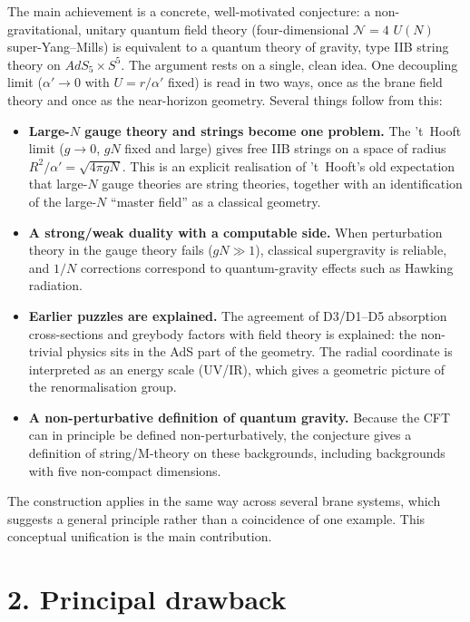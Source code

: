 \documentclass[11pt,a4paper]{article}
\begin{document}
The main achievement is a concrete, well-motivated conjecture: a non-gravitational, unitary quantum field theory (four-dimensional $\mathcal{N}=4$ $U(N)$ super-Yang--Mills) is equivalent to a quantum theory of gravity, type IIB string theory on $AdS_5\times S^5$. The argument rests on a single, clean idea. One decoupling limit ($\alpha'\to0$ with $U=r/\alpha'$ fixed) is read in two ways, once as the brane field theory and once as the near-horizon geometry. Several things follow from this:
\begin{itemize}
\item \textbf{Large-$N$ gauge theory and strings become one problem.} The 't~Hooft limit ($g\to0$, $gN$ fixed and large) gives free IIB strings on a space of radius $R^2/\alpha'=\sqrt{4\pi gN}$. This is an explicit realisation of 't~Hooft's old expectation that large-$N$ gauge theories are string theories, together with an identification of the large-$N$ ``master field'' as a classical geometry.
\item \textbf{A strong/weak duality with a computable side.} When perturbation theory in the gauge theory fails ($gN\gg1$), classical supergravity is reliable, and $1/N$ corrections correspond to quantum-gravity effects such as Hawking radiation.
\item \textbf{Earlier puzzles are explained.} The agreement of D3/D1--D5 absorption cross-sections and greybody factors with field theory is explained: the non-trivial physics sits in the AdS part of the geometry. The radial coordinate is interpreted as an energy scale (UV/IR), which gives a geometric picture of the renormalisation group.
\item \textbf{A non-perturbative definition of quantum gravity.} Because the CFT can in principle be defined non-perturbatively, the conjecture gives a definition of string/M-theory on these backgrounds, including backgrounds with five non-compact dimensions.
\end{itemize}
The construction applies in the same way across several brane systems, which suggests a general principle rather than a coincidence of one example. This conceptual unification is the main contribution.

\section*{2. Principal drawback}
\end{document}
